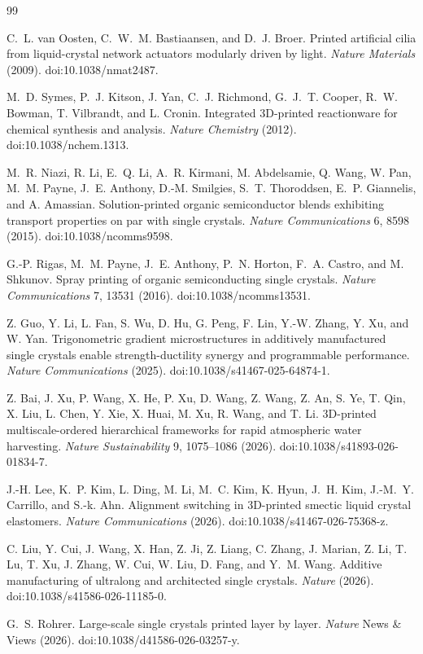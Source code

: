 \documentclass[11pt]{article}
\theoremstyle{definition}
\begin{document}
\begin{thebibliography}{99}

C.~L. van Oosten, C.~W.~M. Bastiaansen, and D.~J. Broer. Printed artificial cilia from liquid-crystal network actuators modularly driven by light. \emph{Nature Materials} (2009). doi:10.1038/nmat2487.

M.~D. Symes, P.~J. Kitson, J. Yan, C.~J. Richmond, G.~J.~T. Cooper, R.~W. Bowman, T. Vilbrandt, and L. Cronin. Integrated 3D-printed reactionware for chemical synthesis and analysis. \emph{Nature Chemistry} (2012). doi:10.1038/nchem.1313.

M.~R. Niazi, R. Li, E.~Q. Li, A.~R. Kirmani, M. Abdelsamie, Q. Wang, W. Pan, M.~M. Payne, J.~E. Anthony, D.-M. Smilgies, S.~T. Thoroddsen, E.~P. Giannelis, and A. Amassian. Solution-printed organic semiconductor blends exhibiting transport properties on par with single crystals. \emph{Nature Communications} 6, 8598 (2015). doi:10.1038/ncomms9598.

G.-P. Rigas, M.~M. Payne, J.~E. Anthony, P.~N. Horton, F.~A. Castro, and M. Shkunov. Spray printing of organic semiconducting single crystals. \emph{Nature Communications} 7, 13531 (2016). doi:10.1038/ncomms13531.

Z. Guo, Y. Li, L. Fan, S. Wu, D. Hu, G. Peng, F. Lin, Y.-W. Zhang, Y. Xu, and W. Yan. Trigonometric gradient microstructures in additively manufactured single crystals enable strength-ductility synergy and programmable performance. \emph{Nature Communications} (2025). doi:10.1038/s41467-025-64874-1.

Z. Bai, J. Xu, P. Wang, X. He, P. Xu, D. Wang, Z. Wang, Z. An, S. Ye, T. Qin, X. Liu, L. Chen, Y. Xie, X. Huai, M. Xu, R. Wang, and T. Li. 3D-printed multiscale-ordered hierarchical frameworks for rapid atmospheric water harvesting. \emph{Nature Sustainability} 9, 1075--1086 (2026). doi:10.1038/s41893-026-01834-7.

J.-H. Lee, K.~P. Kim, L. Ding, M. Li, M.~C. Kim, K. Hyun, J.~H. Kim, J.-M.~Y. Carrillo, and S.-k. Ahn. Alignment switching in 3D-printed smectic liquid crystal elastomers. \emph{Nature Communications} (2026). doi:10.1038/s41467-026-75368-z.

C. Liu, Y. Cui, J. Wang, X. Han, Z. Ji, Z. Liang, C. Zhang, J. Marian, Z. Li, T. Lu, T. Xu, J. Zhang, W. Cui, W. Liu, D. Fang, and Y.~M. Wang. Additive manufacturing of ultralong and architected single crystals. \emph{Nature} (2026). doi:10.1038/s41586-026-11185-0.

G.~S. Rohrer. Large-scale single crystals printed layer by layer. \emph{Nature} News \& Views (2026). doi:10.1038/d41586-026-03257-y.

\end{thebibliography}
\end{document}
